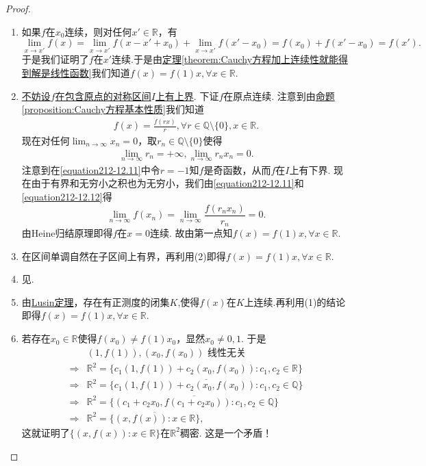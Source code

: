 \documentclass[../../main.tex]{subfiles}%
\begin{document}
\begin{proof}
\begin{enumerate}[(1)]
\item 如果\(f\)在\(x_0\)连续，则对任何\(x'\in\mathbb{R}\)，有
\[
\lim_{x\rightarrow x'} f(x)=\lim_{x\rightarrow x'} f(x - x'+x_0)+\lim_{x\rightarrow x'} f(x' - x_0)=f(x_0)+f(x' - x_0)=f(x').
\]
于是我们证明了\(f\)在\(x'\)连续.于是由\hyperref[theorem:Cauchy方程加上连续性就能得到解是线性函数]{定理\ref{theorem:Cauchy方程加上连续性就能得到解是线性函数}}我们知道\(f(x)=f(1)x,\forall x\in\mathbb{R}\).

\item \hyperlink{不妨设的原因112}{不妨设\(f\)在包含原点的对称区间\(I\)上有上界}. 下证\(f\)在原点连续. 注意到由\hyperref[proposition:Cauchy方程基本性质]{命题\ref{proposition:Cauchy方程基本性质}}我们知道
\begin{align}
f(x)=\frac{f(rx)}{r},\forall r\in\mathbb{Q}\setminus\{0\},x\in\mathbb{R}.\label{equation212-12.11}
\end{align}
现在对任何\(\lim_{n\rightarrow\infty}x_n = 0\)，取\(r_n\in\mathbb{Q}\setminus\{0\}\)使得
\begin{align}
\lim_{n\rightarrow\infty}r_n=+\infty,\lim_{n\rightarrow\infty}r_nx_n = 0.\label{equation212-12.12} 
\end{align}
注意到在\eqref{equation212-12.11}中令\(r = -1\)知\(f\)是奇函数，从而\(f\)在\(I\)上有下界. 现在由于有界和无穷小之积也为无穷小，我们由\eqref{equation212-12.11}和\eqref{equation212-12.12}得
\[
\lim_{n\rightarrow\infty} f(x_n)=\lim_{n\rightarrow\infty}\frac{f(r_nx_n)}{r_n}=0.
\]
由Heine归结原理即得\(f\)在\(x = 0\)连续. 故由第一点知\(f(x)=f(1)x,\forall x\in\mathbb{R}\).

\item 在区间单调自然在子区间上有界，再利用(2)即得\(f(x)=f(1)x,\forall x\in\mathbb{R}\).

\item 见.

\item 由\hyperref[Real Analysis-theorem:Lusin(卢津)定理]{Lusin定理}，存在有正测度的闭集\(K\),使得\(f(x)\)在$K$上连续.再利用(1)的结论即得\(f(x)=f(1)x,\forall x\in\mathbb{R}\).

\item 若存在\(x_0\in\mathbb{R}\)使得\(f(x_0)\neq f(1)x_0\)，显然\(x_0\neq0,1\). 于是
\begin{align*}
&(1,f(1)),(x_0,f(x_0))\text{ 线性无关}\\
\Rightarrow&\mathbb{R}^2=\{c_1(1,f(1))+c_2(x_0,f(x_0)):c_1,c_2\in\mathbb{R}\}\\
\Rightarrow&\mathbb{R}^2=\overline{\{c_1(1,f(1))+c_2(x_0,f(x_0)):c_1,c_2\in\mathbb{Q}\}}\\
\Rightarrow&\mathbb{R}^2=\overline{\{(c_1 + c_2x_0,f(c_1 + c_2x_0)):c_1,c_2\in\mathbb{Q}\}}\\
\Rightarrow&\mathbb{R}^2=\overline{\{(x,f(x)):x\in\mathbb{R}\}},
\end{align*}
这就证明了\(\{(x,f(x)):x\in\mathbb{R}\}\)在\(\mathbb{R}^2\)稠密. 这是一个矛盾！
\end{enumerate}
\end{proof}
\end{document}
